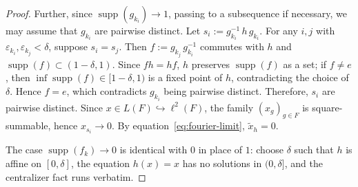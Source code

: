 \documentclass[11pt]{amsart}
\theoremstyle{definition}
\newcommand{\supp}{\operatorname{supp}}
\begin{document}
\begin{proof}
Further, since $\supp(g_{k_i})\to 1$, passing to a subsequence if necessary, we may assume that $g_{k_i}$ are pairwise distinct. Let $s_i := g_{k_i}^{-1}\, h\, g_{k_i}$. For any $i, j$ with $\varepsilon_{k_i}, \varepsilon_{k_j} < \delta$, suppose $s_i = s_j$. Then $f := g_{k_j}\, g_{k_i}^{-1}$ commutes with $h$ and $\supp(f) \subset (1 - \delta, 1)$. Since $fh = hf$, $h$ preserves $\supp(f)$ as a set; if $f \neq e$, then $\inf \supp(f) \in [1 - \delta, 1)$ is a fixed point of $h$, contradicting the choice of $\delta$. Hence $f = e$, which contradicts $g_{k_i}$ being pairwise distinct. Therefore, $s_i$ are pairwise distinct.
Since $x \in L(F) \hookrightarrow \ell^2(F)$, the family $(x_g)_{g \in F}$ is square-summable, hence $x_{s_i} \to 0$. By equation~\eqref{eq:fourier-limit}, $\tilde{x}_h = 0$.

The case $\supp(f_k) \to 0$ is identical with $0$ in place of $1$: choose $\delta$ such that $h$ is affine on $[0, \delta]$, the equation $h(x) = x$ has no solutions in $(0, \delta]$, and the centralizer fact runs verbatim.
\end{proof}
\end{document}
